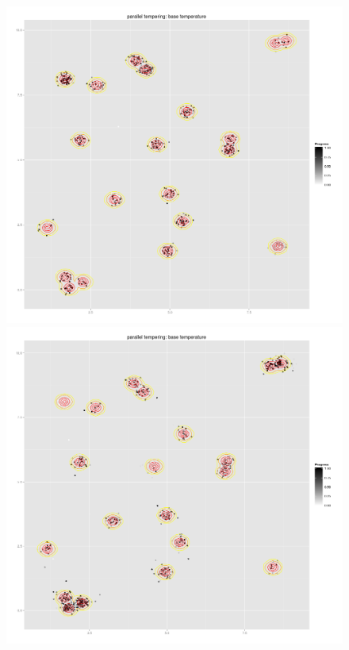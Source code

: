 \begin{figure}
	\begin{minipage}[b]{.5\linewidth}
		\centering \includegraphics[scale=.25]{./img/strat1with2000it.png}
	\end{minipage}%
	\begin{minipage}[b]{.5\linewidth}
		\centering \includegraphics[scale=.25]{./img/strat2it2000.png}		

\end{minipage}
\end{figure}

